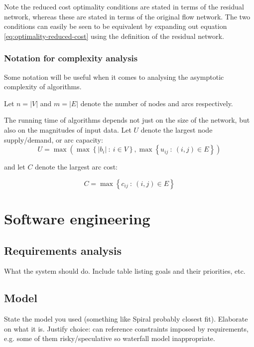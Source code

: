 \begin{remark}
Note the reduced cost optimality conditions are stated in terms of
the residual network, whereas these are stated in terms of the original
flow network. The two conditions can easily be seen to be equivalent
by expanding out equation \ref{eq:optimality-reduced-cost} using the definition of the
residual network.
\end{remark}

\subsubsection{Notation for complexity analysis}

Some notation will be useful when it comes to analysing the asymptotic complexity
of algorithms. 

Let $n=|V|$ and $m=|E|$ denote the number of nodes and arcs respectively.

The running time of algorithms depends not just on the size of the
network, but also on the magnitudes of input data. Let $U$ denote
the largest node supply/demand, or arc capacity:
\begin{equation}
U=\max\left(\max\left\{ |b_{i}|\::\: i\in V\right\} ,\max\left\{ u_{ij}\::\:\left(i,j\right)\in E\right\} \right)
\end{equation}

and let $C$ denote the largest arc cost:

\begin{equation}
C=\max\left\{ c_{ij}\::\:(i,j)\in E\right\} 
\end{equation}

\section{Software engineering} \label{sec:prep-sweng}

\subsection{Requirements analysis} \label{sec:prep-sweng-requirements}
What the system should do. Include table listing goals and their priorities, etc.

\subsection{Model}
State the model you used (something like Spiral probably closest fit). Elaborate on what it is. Justify choice: can reference constraints imposed by requirements, e.g. some of them risky/speculative so waterfall model inappropriate.

